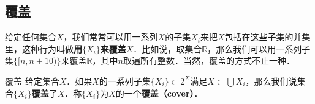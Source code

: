 \subsection{覆盖}

给定任何集合$X$，我们常常可以用一系列$X$的子集$X_i$来把$X$包括在这些子集的并集里，这种行为叫做\textbf{用$\{X_i\}$来覆盖$X$}．比如说，取集合$\mathbb{R}$，那么我们可以用一系列子集$\{[n, n+10)\}$来覆盖$\mathbb{R}$，其中$n$取遍所有整数．当然，覆盖的方式不止一种．

\begin{definition}{覆盖}
给定集合$X$．如果$X$的一系列子集$\{X_i\}\subset 2^X$满足$X\subset\bigcup X_i$，那么我们说集合$\{X_i\}$\textbf{覆盖}了$X$．称$\{X_i\}$为$X$的一个\textbf{覆盖（cover）}．
\end{definition}